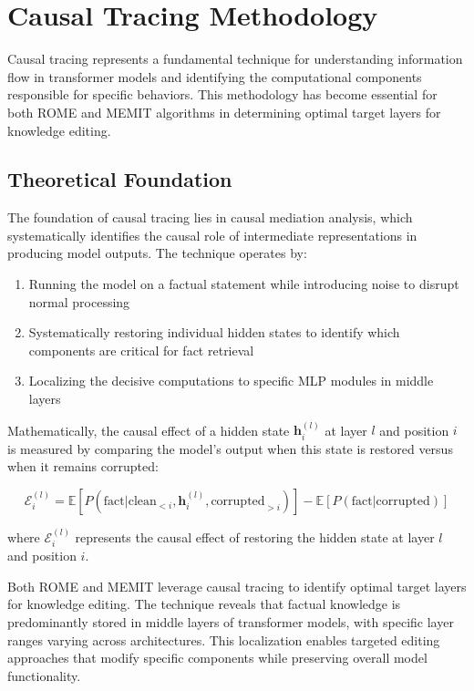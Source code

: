 \section{Causal Tracing Methodology}

Causal tracing represents a fundamental technique for understanding information flow in transformer models and identifying the computational components responsible for specific behaviors. This methodology has become essential for both ROME and MEMIT algorithms in determining optimal target layers for knowledge editing.

\subsection{Theoretical Foundation}

The foundation of causal tracing lies in causal mediation analysis, which systematically identifies the causal role of intermediate representations in producing model outputs. The technique operates by:

\begin{enumerate}
    \item Running the model on a factual statement while introducing noise to disrupt normal processing
    \item Systematically restoring individual hidden states to identify which components are critical for fact retrieval
    \item Localizing the decisive computations to specific MLP modules in middle layers
\end{enumerate}

Mathematically, the causal effect of a hidden state $\mathbf{h}^{(l)}_i$ at layer $l$ and position $i$ is measured by comparing the model's output when this state is restored versus when it remains corrupted:

\begin{equation}
\mathcal{E}^{(l)}_i = \mathbb{E}[P(\text{fact} | \text{clean}_{<i}, \mathbf{h}^{(l)}_i, \text{corrupted}_{>i})] - \mathbb{E}[P(\text{fact} | \text{corrupted})]
\end{equation}

where $\mathcal{E}^{(l)}_i$ represents the causal effect of restoring the hidden state at layer $l$ and position $i$.

Both ROME and MEMIT leverage causal tracing to identify optimal target layers for knowledge editing. The technique reveals that factual knowledge is predominantly stored in middle layers of transformer models, with specific layer ranges varying across architectures. This localization enables targeted editing approaches that modify specific components while preserving overall model functionality.

